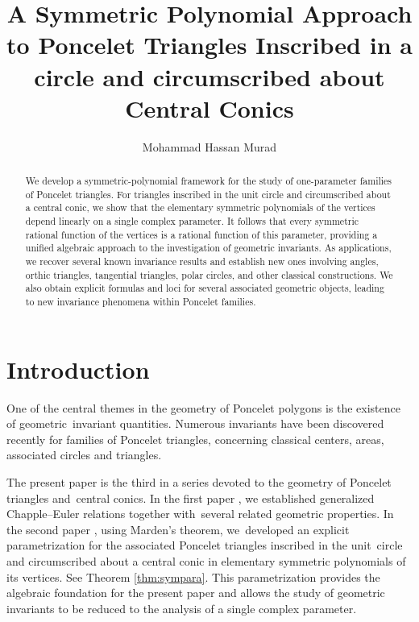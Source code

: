 \documentclass[11pt,reqno]{amsart}
\theoremstyle{definition}
\numberwithin{equation}{section}
\begin{document}


\title[Poncelet Triangles and  Invariants]{A Symmetric Polynomial Approach to Poncelet Triangles Inscribed in a circle and circumscribed about Central Conics}
\author{Mohammad Hassan Murad}
\address{Department of Mathematics\\
The University of Texas at Arlington, Arlington, TX, USA}

\begin{abstract}
We develop a symmetric-polynomial framework for the study of one-parameter families of Poncelet triangles. For triangles inscribed in the unit circle and circumscribed about a central conic, we show that the elementary symmetric polynomials of the vertices depend linearly on a single complex parameter. It follows that every symmetric rational function of the vertices is a rational function of this parameter, providing a unified algebraic approach to the investigation of geometric invariants. As applications, we recover several known invariance results and establish new ones involving angles, orthic triangles, tangential triangles, polar circles, and other classical constructions. We also obtain explicit formulas and loci for several associated geometric objects, leading to new invariance phenomena within Poncelet families.
\end{abstract}


\maketitle{}

\section{Introduction}
\noindent
One of the central themes in the geometry of Poncelet polygons is the existence of geometric \,invariant quantities. Numerous invariants have been discovered recently for families of Poncelet triangles, concerning classical centers, areas, associated circles and triangles.

The present paper is the third in a series devoted to the geometry of Poncelet triangles and \,central conics. In the first paper \cite{Dragovic-Murad2026}, we established generalized Chapple--Euler relations together with \,several related geometric properties. In the second paper \cite{Murad2026b}, using Marden's theorem, we \,developed an explicit parametrization for the associated Poncelet triangles inscribed in the unit \,circle and circumscribed about a central conic in elementary symmetric polynomials of its vertices. See Theorem \ref{thm:sympara}. This parametrization provides the algebraic foundation for the present paper and allows the study of geometric invariants to be reduced to the analysis of a single complex parameter.
\end{document}
